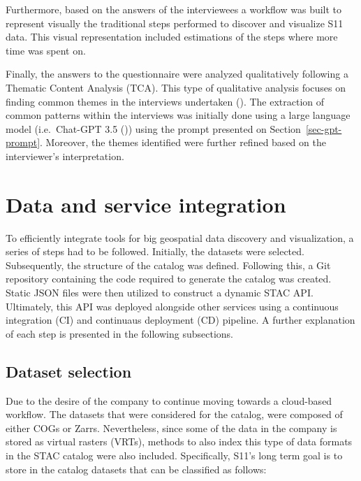 \documentclass[
  oneside,
  open=any]{scrbook}
\begin{document}
Furthermore, based on the answers of the interviewees a workflow was
built to represent visually the traditional steps performed to discover
and visualize S11 data. This visual representation included estimations
of the steps where more time was spent on.

Finally, the answers to the questionnaire were analyzed qualitatively
following a Thematic Content Analysis (TCA). This type of qualitative
analysis focuses on finding common themes in the interviews undertaken
(). The extraction
of common patterns within the interviews was initially done using a
large language model (i.e.~Chat-GPT 3.5
()) using the prompt
presented on Section~\ref{sec-gpt-prompt}. Moreover, the themes
identified were further refined based on the interviewer's
interpretation.

\section{Data and service
integration}\label{data-and-service-integration}

To efficiently integrate tools for big geospatial data discovery and
visualization, a series of steps had to be followed. Initially, the
datasets were selected. Subsequently, the structure of the catalog was
defined. Following this, a Git repository containing the code required
to generate the catalog was created. Static JSON files were then
utilized to construct a dynamic STAC API. Ultimately, this API was
deployed alongside other services using a continuous integration (CI)
and continuaus deployment (CD) pipeline. A further explanation of each
step is presented in the following subsections.

\subsection{Dataset selection}\label{dataset-selection}

Due to the desire of the company to continue moving towards a
cloud-based workflow. The datasets that were considered for the catalog,
were composed of either COGs or Zarrs. Nevertheless, since some of the
data in the company is stored as virtual rasters (VRTs), methods to also
index this type of data formats in the STAC catalog were also included.
Specifically, S11's long term goal is to store in the catalog datasets
that can be classified as follows:
\end{document}
